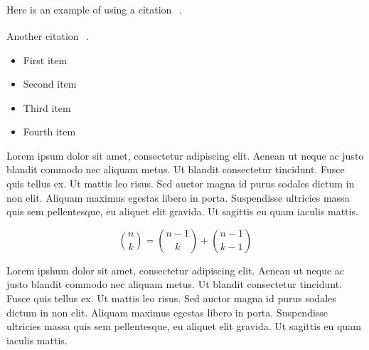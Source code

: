 \documentclass{csmagazine}
\begin{document}
Here is an example of using a citation \textsuperscript{~\cite{Lamport1994a}}.

Another citation \textsuperscript{~\cite{Goossens1997}}.


\begin{itemize}
	\item First item
	\item Second item
	\item Third item
	\item Fourth item
\end{itemize}

Lorem ipsum dolor sit amet, consectetur adipiscing elit. Aenean ut neque ac justo blandit commodo nec aliquam metus. Ut blandit consectetur tincidunt. Fusce quis tellus ex. Ut mattis leo risus. Sed auctor magna id purus sodales dictum in non elit. Aliquam maximus egestas libero in porta. Suspendisse ultricies massa quis sem pellentesque, eu aliquet elit gravida. Ut sagittis eu quam iaculis mattis.



\[\binom{n}{k} =\binom{n-1}{k} + \binom{n-1}{k-1}\]

Lorem ipshum dolor sit amet, consectetur adipiscing elit. Aenean ut neque ac justo blandit commodo nec aliquam metus. Ut blandit consectetur tincidunt. Fusce quis tellus ex. Ut mattis leo risus. Sed auctor magna id purus sodales dictum in non elit. Aliquam maximus egestas libero in porta. Suspendisse ultricies massa quis sem pellentesque, eu aliquet elit gravida. Ut sagittis eu quam iaculis mattis.





\printbibliography[heading=none]








\end{document}
